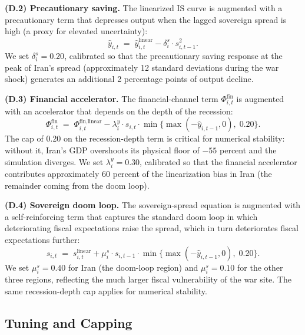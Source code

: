 \documentclass[12pt,a4paper]{article}
\begin{document}
\textbf{(D.2) Precautionary saving.} The linearized IS curve is augmented with a precautionary term that depresses output when the lagged sovereign spread is high (a proxy for elevated uncertainty):
\begin{equation}
\hat{y}_{i,t} \;=\; \hat{y}_{i,t}^{\text{linear}} - \delta^s_i \cdot s_{i,t-1}^2.
\end{equation}
We set $\delta^s_i = 0.20$, calibrated so that the precautionary saving response at the peak of Iran's spread (approximately 12 standard deviations during the war shock) generates an additional 2 percentage points of output decline.

\textbf{(D.3) Financial accelerator.} The financial-channel term $\Phi^{\text{fin}}_{i,t}$ is augmented with an accelerator that depends on the depth of the recession:
\begin{equation}
\Phi^{\text{fin}}_{i,t} \;=\; \Phi^{\text{fin,linear}}_{i,t} - \lambda^y_i \cdot s_{i,t} \cdot \min\{\max(-\hat{y}_{i,t-1}, 0),\; 0.20\}.
\end{equation}
The cap of 0.20 on the recession-depth term is critical for numerical stability: without it, Iran's GDP overshoots its physical floor of $-55$ percent and the simulation diverges. We set $\lambda^y_i = 0.30$, calibrated so that the financial accelerator contributes approximately 60 percent of the linearization bias in Iran (the remainder coming from the doom loop).

\textbf{(D.4) Sovereign doom loop.} The sovereign-spread equation is augmented with a self-reinforcing term that captures the standard doom loop in which deteriorating fiscal expectations raise the spread, which in turn deteriorates fiscal expectations further:
\begin{equation}
s_{i,t} \;=\; s_{i,t}^{\text{linear}} + \mu^s_i \cdot s_{i,t-1} \cdot \min\{\max(-\hat{y}_{i,t-1}, 0),\; 0.20\}.
\end{equation}
We set $\mu^s_i = 0.40$ for Iran (the doom-loop region) and $\mu^s_i = 0.10$ for the other three regions, reflecting the much larger fiscal vulnerability of the war site. The same recession-depth cap applies for numerical stability.

\subsection{Tuning and Capping}
\end{document}
